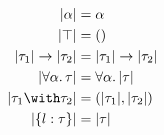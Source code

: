 
\begin{align*}
  \im \alpha                    &= \alpha \\
  \im \top                      &= () \\
  \im {\tau_1} \to \im {\tau_2} &= \im {\tau_1} \to \im {\tau_2} \\
  \im {\for \alpha \tau}        &= \for \alpha \im \tau \\
  \im {\tau_1 \andOp \tau_2}    &= \pair {\im {\tau_1}} {\im {\tau_2}} \\
  \im {\recordType l \tau}      &= \im \tau
\end{align*}